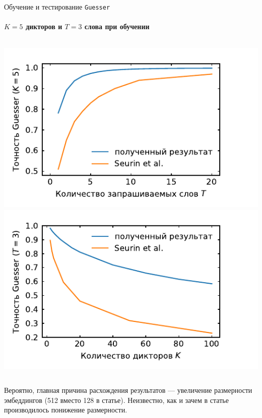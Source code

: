 \documentclass[aspectratio=169]{beamer}
\newcommand{\guesser}{\texttt{Guesser}}
\begin{document}
\begin{frame}{Обучение и тестирование \guesser{}}
    \framesubtitle{$K = 5$ дикторов  и $T = 3$ слова при обучении}
    \begin{columns}
        \centering
        \includegraphics[width=.95\textwidth]{../plots/word_sweep.pdf}
        \includegraphics[width=.95\textwidth]{../plots/guest_sweep.pdf}
    \end{columns}\vspace*{1em}

    Вероятно, главная причина расхождения результатов --- увеличение размерности
    эмбеддингов (512 вместо 128 в статье). Неизвестно, как и зачем в статье
    производилось понижение размерности.
\end{frame}
\end{document}

